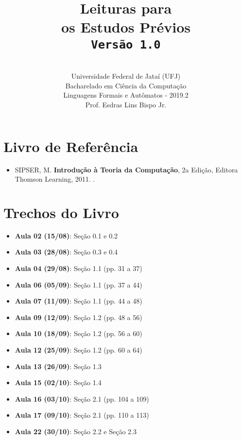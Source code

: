 \documentclass[12pt,a4paper,oneside]{article}
\author{\\Universidade Federal de Jataí (UFJ)\\Bacharelado em Ciência da Computação \\Linguagens Formais e Autômatos - 2019.2 \\Prof. Esdras Lins Bispo Jr.}
\date{}
\title{
	\sc \huge Leituras para \\os Estudos Prévios
	\\{\tt Versão 1.0}
}
\begin{document}
\maketitle

\section{Livro de Referência}
	\begin{itemize}
		\item SIPSER, M. {\bf Introdução à Teoria da Computação}, 2a Edição, Editora Thomson Learning, 2011. \color{blue}{\bf Código Bib.: [004 SIP/int]}.
	\end{itemize}
	
\section{Trechos do Livro}

\begin{itemize}
	
	\item[] {\bf Aula 02 (15/08)}: Seção 0.1 e 0.2
	\item[] {\bf Aula 03 (28/08)}: Seção 0.3 e 0.4
	\item[] {\bf Aula 04 (29/08)}: Seção 1.1 (pp. 31 a 37)
	\item[] {\bf Aula 06 (05/09)}: Seção 1.1 (pp. 37 a 44)
	\item[] {\bf Aula 07 (11/09)}: Seção 1.1 (pp. 44 a 48)
	\item[] {\bf Aula 09 (12/09)}: Seção 1.2 (pp. 48 a 56)
	\item[] {\bf Aula 10 (18/09)}: Seção 1.2 (pp. 56 a 60)
	\item[] {\bf Aula 12 (25/09)}: Seção 1.2 (pp. 60 a 64)
	\item[] {\bf Aula 13 (26/09)}: Seção 1.3
	\item[] {\bf Aula 15 (02/10)}: Seção 1.4
	\item[] {\bf Aula 16 (03/10)}: Seção 2.1 (pp. 104 a 109)
	\item[] {\bf Aula 17 (09/10)}: Seção 2.1 (pp. 110 a 113)
	\item[] {\bf Aula 22 (30/10)}: Seção 2.2 e Seção 2.3
	
\end{itemize}
\end{document}
